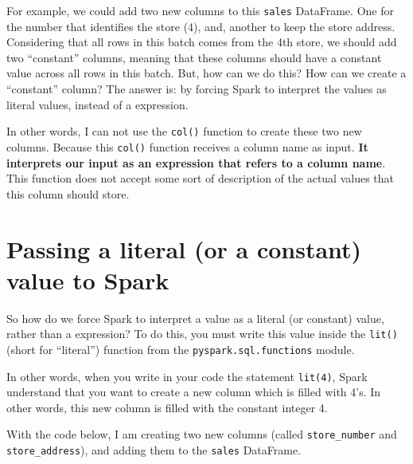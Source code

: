 \documentclass[
  11pt,
  letterpaper,
  DIV=11,
  numbers=noendperiod]{scrreprt}
\begin{document}
For example, we could add two new columns to this \texttt{sales}
DataFrame. One for the number that identifies the store (4), and,
another to keep the store address. Considering that all rows in this
batch comes from the 4th store, we should add two ``constant'' columns,
meaning that these columns should have a constant value across all rows
in this batch. But, how can we do this? How can we create a ``constant''
column? The answer is: by forcing Spark to interpret the values as
literal values, instead of a expression.

In other words, I can not use the \texttt{col()} function to create
these two new columns. Because this \texttt{col()} function receives a
column name as input. \textbf{It interprets our input as an expression
that refers to a column name}. This function does not accept some sort
of description of the actual values that this column should store.

\hypertarget{sec-literal-values}{%
\section{Passing a literal (or a constant) value to
Spark}\label{sec-literal-values}}

So how do we force Spark to interpret a value as a literal (or constant)
value, rather than a expression? To do this, you must write this value
inside the \texttt{lit()} (short for ``literal'') function from the
\texttt{pyspark.sql.functions} module.

In other words, when you write in your code the statement
\texttt{lit(4)}, Spark understand that you want to create a new column
which is filled with 4's. In other words, this new column is filled with
the constant integer 4.

With the code below, I am creating two new columns (called
\texttt{store\_number} and \texttt{store\_address}), and adding them to
the \texttt{sales} DataFrame.
\end{document}
